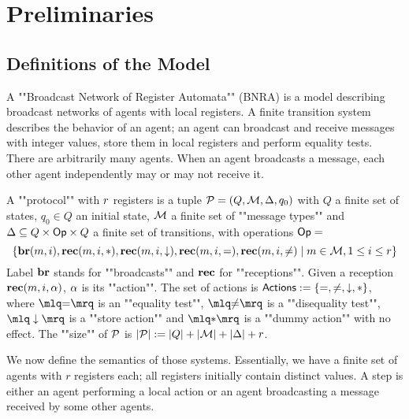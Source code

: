 \section{Preliminaries}
\label{sec:preliminaries}

\subsection{Definitions of the Model}
A ""Broadcast Network of Register Automata"" (BNRA) \cite{DelzannoST13} is a model describing broadcast networks of agents with local registers. A finite transition system describes the behavior of an agent; an agent can broadcast and receive messages with integer values, store them in local registers and perform equality tests. 
There are arbitrarily many agents. When an agent broadcasts a message, each other agent independently may or may not receive it. 

\begin{definition}[Protocols]
	A ""protocol"" with $r$ registers is a tuple $\mathcal{P} = (Q, \mathcal{M}, \Delta, q_0)$  with $Q$ a finite set of states, $q_0 \in Q$ an initial state, $\mathcal{M}$ a finite set of ""message types""  and $\Delta \subseteq Q \times \mathsf{Op} \times Q$ a finite set of transitions, with operations $\mathsf{Op} =$
	\[
	 \{\textbf{br}(m, i), \textbf{rec}(m, i, {*}), \textbf{rec}(m, i, \downarrow), \textbf{rec}(m, i, {=}), \textbf{rec}(m, i, {\ne}) \mid m \in \mathcal{M}, 1 \leq i \leq r\}\]
	Label $\textbf{br}$ stands for ""broadcasts"" and $\textbf{rec}$ for ""receptions"".
	Given a reception $\textbf{rec}(m, i, \alpha)$, $\alpha$ is its ""action"". 
The set of actions is $\mathsf{Actions} := \{{=}, {\ne}, \downarrow, {*}\}$, where 
$\quotemarks{\eqtestact}$ is an ""equality test"", $\quotemarks{\diseqtestact}$ is a ""disequality test"", $\quotemarks{\enregact}$ is a ""store action"" and $\quotemarks{\dummyact}$ is a ""dummy action"" with no effect.
The ""size"" of $\mathcal{P}$ is $|\mathcal{P}| := |Q| + |\mathcal{M}| + |\Delta| + r$.

\end{definition}

We now define the semantics of those systems. Essentially, we have a finite set of agents with $r$ registers each; all registers initially contain distinct values. A step is either an agent performing a local action or an agent broadcasting a message received by some other agents.

